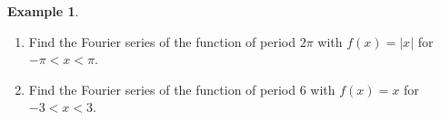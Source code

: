 \documentclass[11pt,a4paper]{article}
\theoremstyle{definition}
\newtheorem{exa}[thm]{Example}
\begin{document}
\begin{exa}
\label{ex:evenodd}
\begin{enumerate}
\item Find the Fourier series of the function of period $2\pi$ with $f(x) = |x|$
for $-\pi < x < \pi$.

\item Find the Fourier series of the function of period $6$ with $f(x) = x$ for
$-3 < x < 3$.

\begin{figure}[H]
\centering
{}
\end{figure}
\end{enumerate}
\end{exa}
\end{document}
